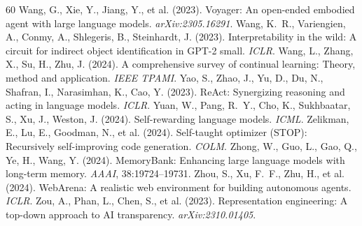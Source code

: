 \documentclass{article}
\begin{document}
\begin{thebibliography}{60}
 Wang, G., Xie, Y., Jiang, Y., et al. (2023). Voyager: An open-ended embodied agent with large language models. \emph{arXiv:2305.16291}.
 Wang, K.~R., Variengien, A., Conmy, A., Shlegeris, B., Steinhardt, J. (2023). Interpretability in the wild: A circuit for indirect object identification in GPT-2 small. \emph{ICLR}.
 Wang, L., Zhang, X., Su, H., Zhu, J. (2024). A comprehensive survey of continual learning: Theory, method and application. \emph{IEEE TPAMI}.
 Yao, S., Zhao, J., Yu, D., Du, N., Shafran, I., Narasimhan, K., Cao, Y. (2023). ReAct: Synergizing reasoning and acting in language models. \emph{ICLR}.
 Yuan, W., Pang, R.~Y., Cho, K., Sukhbaatar, S., Xu, J., Weston, J. (2024). Self-rewarding language models. \emph{ICML}.
 Zelikman, E., Lu, E., Goodman, N., et al. (2024). Self-taught optimizer (STOP): Recursively self-improving code generation. \emph{COLM}.
 Zhong, W., Guo, L., Gao, Q., Ye, H., Wang, Y. (2024). MemoryBank: Enhancing large language models with long-term memory. \emph{AAAI}, 38:19724--19731.
 Zhou, S., Xu, F.~F., Zhu, H., et al. (2024). WebArena: A realistic web environment for building autonomous agents. \emph{ICLR}.
 Zou, A., Phan, L., Chen, S., et al. (2023). Representation engineering: A top-down approach to AI transparency. \emph{arXiv:2310.01405}.
\end{thebibliography}
\end{document}
